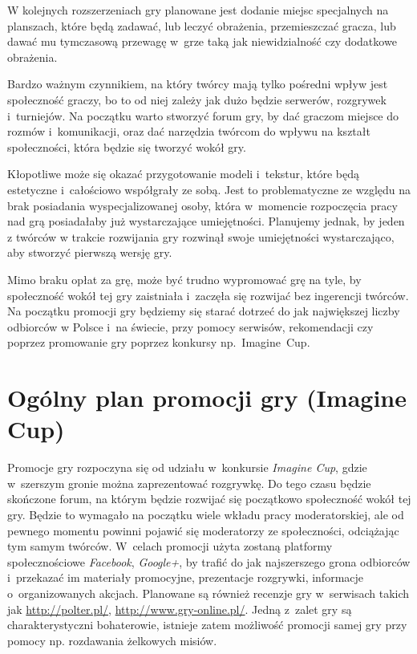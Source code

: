 W kolejnych rozszerzeniach gry planowane jest dodanie miejsc specjalnych na planszach, które będą zadawać, lub leczyć obrażenia, przemieszczać gracza, lub dawać mu tymczasową przewagę w~grze taką jak niewidzialność czy dodatkowe obrażenia.

Bardzo ważnym czynnikiem, na który twórcy mają tylko pośredni wpływ jest społeczność graczy, bo to od niej zależy jak dużo będzie serwerów, rozgrywek i~turniejów. Na początku warto stworzyć forum gry, by dać graczom miejsce do rozmów i~komunikacji, oraz dać narzędzia twórcom do wpływu na kształt społeczności, która będzie się tworzyć wokół gry.

Kłopotliwe może się okazać przygotowanie modeli i~tekstur, które będą estetyczne i~całościowo współgrały ze sobą. Jest to problematyczne ze względu na brak posiadania wyspecjalizowanej osoby, która w~momencie rozpoczęcia pracy nad grą posiadałaby już wystarczające umiejętności. Planujemy jednak, by jeden z twórców w trakcie rozwijania gry rozwinął swoje umiejętności wystarczająco, aby stworzyć pierwszą wersję gry.

Mimo braku opłat za grę, może być trudno wypromować grę na tyle, by społeczność wokół tej gry zaistniała i~zaczęła się rozwijać bez ingerencji twórców. Na początku promocji gry będziemy się starać dotrzeć do jak największej liczby odbiorców w Polsce i~na świecie, przy pomocy serwisów, rekomendacji czy poprzez promowanie gry poprzez konkursy np.~Imagine~Cup. 

\section{Ogólny plan promocji gry (Imagine Cup)}
Promocje gry rozpoczyna się od udziału w~konkursie \textit{Imagine Cup}, gdzie w~szerszym gronie można zaprezentować rozgrywkę. Do tego czasu będzie skończone forum, na którym będzie rozwijać się początkowo społeczność wokół tej gry. Będzie to wymagało na początku wiele wkładu pracy moderatorskiej, ale od pewnego momentu powinni pojawić się moderatorzy ze społeczności, odciążając tym samym twórców. W~celach promocji użyta zostaną platformy społecznościowe \textit{Facebook}, \textit{Google+}, by trafić do jak najszerszego grona odbiorców i~przekazać im materiały promocyjne, prezentacje rozgrywki, informacje o~organizowanych akcjach. Planowane są również recenzje gry w~serwisach takich jak \url{http://polter.pl/}, \url{http://www.gry-online.pl/}. Jedną z~zalet gry są charakterystyczni bohaterowie, istnieje zatem możliwość promocji samej gry przy pomocy np. rozdawania żelkowych misiów.
